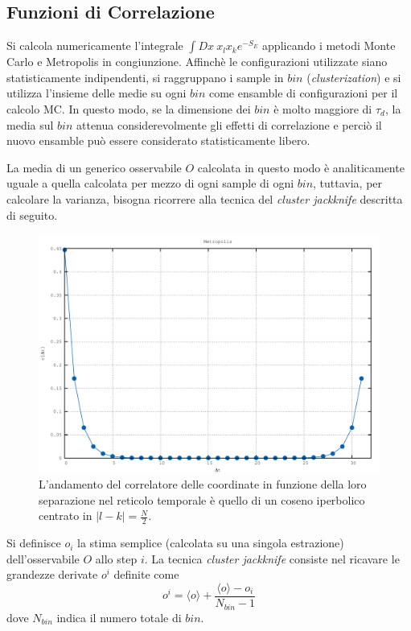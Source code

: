 \subsection{Funzioni di Correlazione}

Si calcola numericamente l'integrale $\int Dx \ x_lx_ke^{-S_E}$ applicando i metodi Monte Carlo e Metropolis in congiunzione. Affinchè le configurazioni utilizzate siano statisticamente indipendenti, si raggruppano i sample in $bin$ (\textit{clusterization}) e si utilizza l'insieme delle medie su ogni $bin$ come ensamble di configurazioni per il calcolo MC. In questo modo, se la dimensione dei $bin$ è molto maggiore di $\tau_d$, la media sul $bin$ attenua considerevolmente gli effetti di correlazione e perciò il nuovo ensamble può essere considerato statisticamente libero.

La media di un generico osservabile $O$ calcolata in questo modo è analiticamente uguale a quella calcolata per mezzo di ogni sample di ogni $bin$, tuttavia, per calcolare la varianza, bisogna ricorrere alla tecnica del \textit{cluster jackknife} descritta di seguito.

\begin{figure}[H]
\centering
\includegraphics[width=\textwidth]{correlation}
\caption{L'andamento del correlatore delle coordinate in funzione della loro separazione nel reticolo temporale è quello di un coseno iperbolico centrato in $|l-k|=\tfrac{N}{2}$.}
\label{fig:correlation}
\end{figure}

Si definisce $o_i$ la stima semplice (calcolata su una singola estrazione) dell'osservabile $O$ allo step $i$. La tecnica \textit{cluster jackknife} consiste nel ricavare le grandezze derivate $o^i$ definite come $$o^i=\langle o\rangle+\frac{\langle o\rangle-o_i}{N_{bin}-1}$$ dove $N_{bin}$ indica il numero totale di $bin$.



